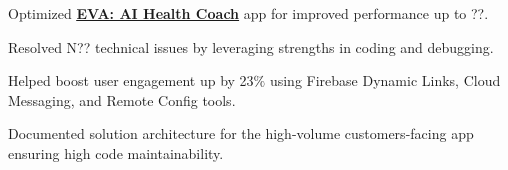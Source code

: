 \documentclass[]{deedy-resume-reversed}
\begin{document}
\begin{minipage}[t]{0.6\textwidth}
\begin{tightemize}
\item Optimized \textbf{\underline{\href{https://www.thehealthycompany.in/eva/}{EVA: AI Health Coach}}} app for improved performance up to ??.
\item Resolved N?? technical issues by leveraging strengths in coding and debugging.
\item Helped boost user engagement up by 23$\%$ using Firebase Dynamic Links, Cloud Messaging, and Remote Config tools.
\item Documented solution architecture for the high-volume customers-facing app ensuring high code maintainability.
\end{tightemize}
\sectionsep




\end{minipage}
\end{document}
